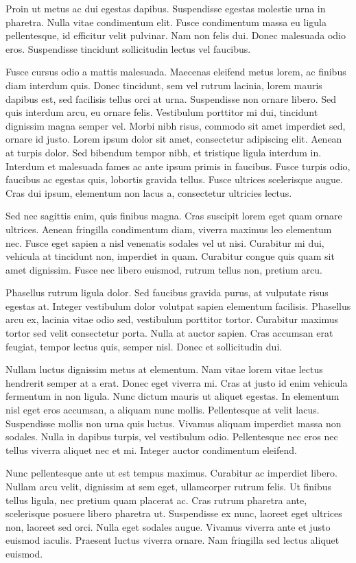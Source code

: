 Proin ut metus ac dui egestas dapibus. Suspendisse egestas molestie urna in pharetra. Nulla vitae condimentum elit. Fusce condimentum massa eu ligula pellentesque, id efficitur velit pulvinar. Nam non felis dui. Donec malesuada odio eros. Suspendisse tincidunt sollicitudin lectus vel faucibus.

Fusce cursus odio a mattis malesuada. Maecenas eleifend metus lorem, ac finibus diam interdum quis. Donec tincidunt, sem vel rutrum lacinia, lorem mauris dapibus est, sed facilisis tellus orci at urna. Suspendisse non ornare libero. Sed quis interdum arcu, eu ornare felis. Vestibulum porttitor mi dui, tincidunt dignissim magna semper vel. Morbi nibh risus, commodo sit amet imperdiet sed, ornare id justo. Lorem ipsum dolor sit amet, consectetur adipiscing elit. Aenean at turpis dolor. Sed bibendum tempor nibh, et tristique ligula interdum in. Interdum et malesuada fames ac ante ipsum primis in faucibus. Fusce turpis odio, faucibus ac egestas quis, lobortis gravida tellus. Fusce ultrices scelerisque augue. Cras dui ipsum, elementum non lacus a, consectetur ultricies lectus.

Sed nec sagittis enim, quis finibus magna. Cras suscipit lorem eget quam ornare ultrices. Aenean fringilla condimentum diam, viverra maximus leo elementum nec. Fusce eget sapien a nisl venenatis sodales vel ut nisi. Curabitur mi dui, vehicula at tincidunt non, imperdiet in quam. Curabitur congue quis quam sit amet dignissim. Fusce nec libero euismod, rutrum tellus non, pretium arcu.

Phasellus rutrum ligula dolor. Sed faucibus gravida purus, at vulputate risus egestas at. Integer vestibulum dolor volutpat sapien elementum facilisis. Phasellus arcu ex, lacinia vitae odio sed, vestibulum porttitor tortor. Curabitur maximus tortor sed velit consectetur porta. Nulla at auctor sapien. Cras accumsan erat feugiat, tempor lectus quis, semper nisl. Donec et sollicitudin dui.

Nullam luctus dignissim metus at elementum. Nam vitae lorem vitae lectus hendrerit semper at a erat. Donec eget viverra mi. Cras at justo id enim vehicula fermentum in non ligula. Nunc dictum mauris ut aliquet egestas. In elementum nisl eget eros accumsan, a aliquam nunc mollis. Pellentesque at velit lacus. Suspendisse mollis non urna quis luctus. Vivamus aliquam imperdiet massa non sodales. Nulla in dapibus turpis, vel vestibulum odio. Pellentesque nec eros nec tellus viverra aliquet nec et mi. Integer auctor condimentum eleifend.

Nunc pellentesque ante ut est tempus maximus. Curabitur ac imperdiet libero. Nullam arcu velit, dignissim at sem eget, ullamcorper rutrum felis. Ut finibus tellus ligula, nec pretium quam placerat ac. Cras rutrum pharetra ante, scelerisque posuere libero pharetra ut. Suspendisse ex nunc, laoreet eget ultrices non, laoreet sed orci. Nulla eget sodales augue. Vivamus viverra ante et justo euismod iaculis. Praesent luctus viverra ornare. Nam fringilla sed lectus aliquet euismod.